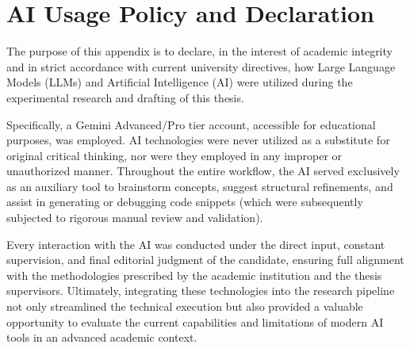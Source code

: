 \chapter{AI Usage Policy and Declaration}
\label{app:ai_usage}

The purpose of this appendix is to declare, in the interest of academic integrity and in strict accordance with current university directives, how Large Language Models (LLMs) and Artificial Intelligence (AI) were utilized during the experimental research and drafting of this thesis. 

Specifically, a Gemini Advanced/Pro tier account, accessible for educational purposes, was employed. AI technologies were never utilized as a substitute for original critical thinking, nor were they employed in any improper or unauthorized manner. Throughout the entire workflow, the AI served exclusively as an auxiliary tool to brainstorm concepts, suggest structural refinements, and assist in generating or debugging code snippets (which were subsequently subjected to rigorous manual review and validation). 

Every interaction with the AI was conducted under the direct input, constant supervision, and final editorial judgment of the candidate, ensuring full alignment with the methodologies prescribed by the academic institution and the thesis supervisors. Ultimately, integrating these technologies into the research pipeline not only streamlined the technical execution but also provided a valuable opportunity to evaluate the current capabilities and limitations of modern AI tools in an advanced academic context.